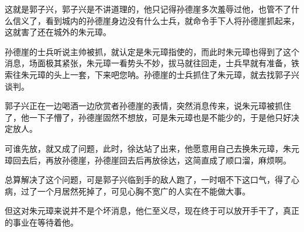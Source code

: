 \begin{multicols}{\theparacolNo}
		这就是郭子兴，郭子兴是不讲道理的，他只记得孙德崖多次羞辱过他，也管不了什么信义了，看到城内的孙德崖身边没有什么士兵，就命令手下人将孙德崖抓起来，这就害了还在城外的朱元璋。

		孙德崖的士兵听说主帅被抓，就认定是朱元璋指使的，而此时朱元璋也得到了这个消息，场面极其紧张，朱元璋一看势头不妙，拔马就往回走，士兵早就有准备，铁索往朱元璋的头上一套，下来吧您呐。孙德崖的士兵抓住了朱元璋，就去找郭子兴谈判。

		郭子兴正在一边喝酒一边欣赏者孙德崖的表情，突然消息传来，说朱元璋被抓住了，他一下子懵了，孙德崖固然不想放，可是朱元璋也是不能少的，于是他只好决定放人。

		可谁先放，就又成了问题，此时，徐达站了出来，他愿意用自己去换朱元璋，朱元璋回去后，再放孙德崖，孙德崖回去后再放徐达，这简直成了顺口溜，麻烦啊。

		总算解决了这个问题，可是郭子兴临到手的敌人跑了，一时咽不下这口气，得了心病，过了一个月居然死掉了，可见心胸不宽广的人实在不能做大事。

		但这对朱元璋来说并不是个坏消息，他仁至义尽，现在终于可以放开手干了，真正的事业在等待着他。
		\ifnum{}
	\end{multicols}
\fi
\newpage
